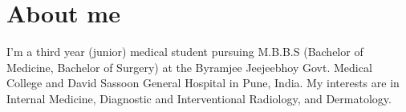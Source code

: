 \section{About me}
    \vspace{2.5mm}
    \small{I’m a third year (junior) medical student pursuing M.B.B.S (Bachelor of Medicine, Bachelor of Surgery)
    at the Byramjee Jeejeebhoy Govt. Medical College and David Sassoon General Hospital in Pune, India.
    My interests are in Internal Medicine, Diagnostic and Interventional Radiology, and Dermatology.}

    \vspace{-2.5mm}